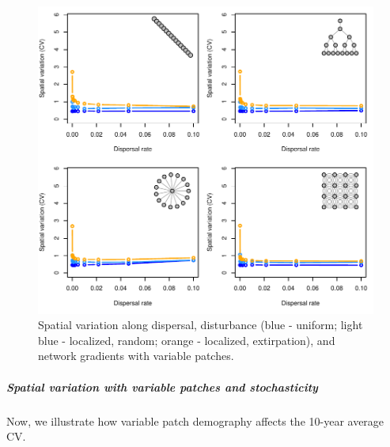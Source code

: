 \documentclass[]{article}
\let\oldsubparagraph\subparagraph
\renewcommand{\subparagraph}[1]{\oldsubparagraph{#1}\mbox{}}
\begin{document}
\begin{figure}[H]

{\centering \includegraphics{Managing_for_ecological_surprises_in_metapopulations_makeHTML_files/figure-latex/CV with variable patches-1} 

}

\caption{Spatial variation along dispersal, disturbance (blue - uniform; light blue - localized, random; orange - localized, extirpation), and network gradients with variable patches.}\label{fig:CV with variable patches}
\end{figure}

\hypertarget{spatial-variation-with-variable-patches-and-stochasticity}{%
\subparagraph{Spatial variation with variable patches and
stochasticity}\label{spatial-variation-with-variable-patches-and-stochasticity}}

Now, we illustrate how variable patch demography affects the 10-year
average CV.
\end{document}
